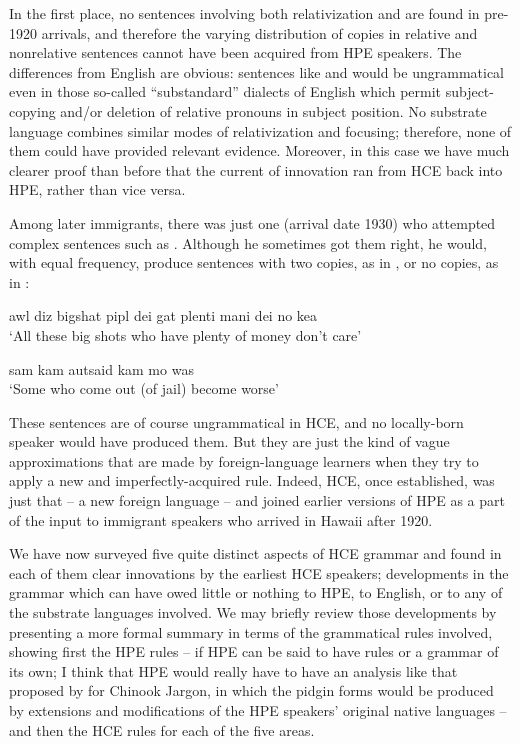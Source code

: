 In the first place, no sentences involving both relativization and  are found in pre-1920 arrivals, and therefore the varying distribution of copies in relative and nonrelative sentences cannot have been acquired from HPE speakers. The differences from English are obvious: sentences like   and   would be ungramma\-tical even in those so-called ``substandard'' dialects of English which permit subject-copying and/or deletion of relative pronouns in subject position. No substrate language combines similar modes of relativization and focusing; therefore, none of them could have pro\-vided relevant evidence. Moreover, in this case we have much clearer proof than before that the current of innovation ran from HCE back into HPE, rather than vice versa.

Among later immigrants, there was just one (arrival date 1930) who attempted complex sentences such as . Although he some\-times got them right, he would, with equal frequency, produce sen\-tences with two copies, as in , or no copies, as in :

\ea\label{ex:84}
awl diz bigshat pipl dei gat plenti mani dei no kea\\
\glt `All these big shots who have plenty of money don't care' 
\z

\ea\label{ex:85} 
sam kam autsaid kam mo was\\
\glt `Some who come out (of jail) become worse'
\z

\noindent These sentences are of course ungrammatical in HCE, and no locally-born speaker would have produced them. But they are just the kind of vague approximations that are made by foreign-language learners when they try to apply a new and imperfectly-acquired rule. Indeed, HCE, once established, was just that -- a new foreign language -- and joined earlier versions of HPE as a part of the input to immigrant speakers who arrived in Hawaii after 1920.


We have now surveyed five quite distinct aspects of HCE gram\-mar and found in each of them clear innovations by the earliest HCE
speakers; developments in the grammar which can have owed little or nothing to HPE, to English, or to any of the substrate languages involved. We may briefly review those developments by presenting a more formal summary in terms of the grammatical rules involved, showing first the HPE rules -- if HPE can be said to have rules or a grammar of its own; I think that HPE would really have to have an analysis like that proposed by \citet{Silverstein1972} for Chinook Jargon, in which the pidgin forms would be produced by extensions and modifications of the HPE speakers' original native languages -- and then the HCE rules for each of the five areas.

